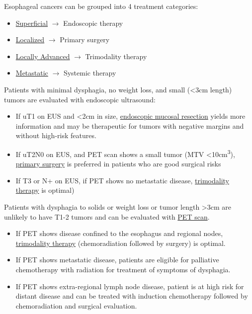 \documentclass[
]{book}
\providecommand{\tightlist}{%
  \setlength{\itemsep}{0pt}\setlength{\parskip}{0pt}}
\begin{document}
Esophageal cancers can be grouped into 4 treatment categories:

\begin{itemize}
\tightlist
\item
  \protect\hyperlink{superficial}{Superficial} \(\rightarrow\) Endoscopic therapy
\item
  \protect\hyperlink{localized}{Localized} \(\rightarrow\) Primary surgery
\item
  \protect\hyperlink{locally_advanced}{Locally Advanced} \(\rightarrow\) Trimodality therapy
\item
  \protect\hyperlink{metastatic}{Metastatic} \(\rightarrow\) Systemic therapy
\end{itemize}

Patients with minimal dysphagia, no weight loss, and small (\textless3cm length) tumors are evaluated with endoscopic ultrasound:

\begin{itemize}
\tightlist
\item
  If uT1 on EUS and \textless2cm in size, \protect\hyperlink{emr}{endoscopic mucosal resection} yields more information and may be therapeutic for tumors with negative margins and without high-risk features.
\item
  If uT2N0 on EUS, and PET scan shows a small tumor (MTV \textless10cm\textsuperscript{3}), \protect\hyperlink{primary_surgery}{primary surgery} is preferred in patients who are good surgical risks
\item
  If T3 or N+ on EUS, if PET shows no metastatic disease, \protect\hyperlink{trimodality}{trimodality therapy} is optimal)
\end{itemize}

Patients with dysphagia to solids or weight loss or tumor length \textgreater3cm are unlikely to have T1-2 tumors and can be evaluated with \protect\hyperlink{pet}{PET scan}.

\begin{itemize}
\tightlist
\item
  If PET shows disease confined to the esophagus and regional nodes, \protect\hyperlink{trimodality}{trimodality therapy} (chemoradiation followed by surgery) is optimal.
\item
  If PET shows metastatic disease, patients are eligible for palliative chemotherapy with radiation for treatment of symptoms of dysphagia.
\item
  If PET shows extra-regional lymph node disease, patient is at high risk for distant disease and can be treated with induction chemotherapy followed by chemoradiation and surgical evaluation.
\end{itemize}
\end{document}
